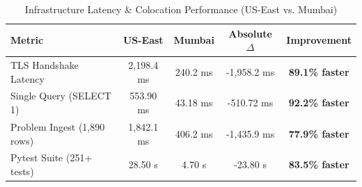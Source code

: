 \begin{table}[!t]
\centering
\caption{Infrastructure Latency & Colocation Performance (US-East vs. Mumbai)}
\label{tab:latency_colocation_summary}
\begin{tabular}{lcccc}
\toprule
\textbf{Metric} & \textbf{US-East} & \textbf{Mumbai} & \textbf{Absolute $\Delta$} & \textbf{Improvement} \\
\midrule
TLS Handshake Latency & 2,198.4 ms & 240.2 ms & -1,958.2 ms & \textbf{89.1\% faster} \\
Single Query (SELECT 1) & 553.90 ms & 43.18 ms & -510.72 ms & \textbf{92.2\% faster} \\
Problem Ingest (1,890 rows) & 1,842.1 ms & 406.2 ms & -1,435.9 ms & \textbf{77.9\% faster} \\
Pytest Suite (251+ tests) & 28.50 s & 4.70 s & -23.80 s & \textbf{83.5\% faster} \\
\bottomrule
\end{tabular}
\end{table}

